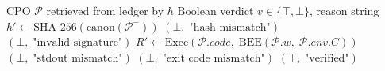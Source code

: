 \documentclass[11pt]{article}
\begin{document}
\begin{algorithm}[h]
\caption{$\mathrm{Verify}(\mathcal{P})$}
\label{alg:verify}
\begin{algorithmic}[1]
\Require CPO $\mathcal{P}$ retrieved from ledger by $h$
\Ensure Boolean verdict $v \in \{\top, \bot\}$, reason string
\State $h' \gets \mathrm{SHA\text{-}256}(\mathrm{canon}(\mathcal{P}^-))$
  \Return $(\bot,\; \text{"hash mismatch"})$
\EndIf
{}
  \Return $(\bot,\; \text{"invalid signature"})$
\EndIf
\State $R' \gets \mathrm{Exec}(\mathcal{P}.\textit{code},\;
                                \mathrm{BEE}(\mathcal{P}.w,\; \mathcal{P}.\textit{env}.C))$
  \Return $(\bot,\; \text{"stdout mismatch"})$
\EndIf
{}
  \Return $(\bot,\; \text{"exit code mismatch"})$
\EndIf
\Return $(\top,\; \text{"verified"})$
\end{algorithmic}
\end{algorithm}
\end{document}
